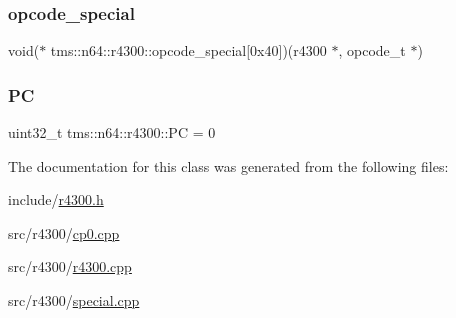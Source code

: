 \mbox{\label{classtms_1_1n64_1_1r4300_a0726d158c0880585ead0c74bcacedbc5}} 
\subsubsection{\texorpdfstring{opcode\+\_\+special}{opcode\_special}}
{\footnotesize\ttfamily void($\ast$ tms\+::n64\+::r4300\+::opcode\+\_\+special\mbox{[}0x40\mbox{]})(r4300 $\ast$, opcode\+\_\+t $\ast$)\hspace{0.3cm}{\ttfamily [private]}}

\mbox{\label{classtms_1_1n64_1_1r4300_aa173e660cb889b933ed965b6d263e3dd}} 
\subsubsection{\texorpdfstring{PC}{PC}}
{\footnotesize\ttfamily uint32\+\_\+t tms\+::n64\+::r4300\+::\+PC = 0\hspace{0.3cm}{\ttfamily [private]}}



The documentation for this class was generated from the following files\+:\begin{DoxyCompactItemize}
\item 
include/\hyperlink{r4300_8h}{r4300.\+h}\item 
src/r4300/\hyperlink{cp0_8cpp}{cp0.\+cpp}\item 
src/r4300/\hyperlink{r4300_8cpp}{r4300.\+cpp}\item 
src/r4300/\hyperlink{special_8cpp}{special.\+cpp}\end{DoxyCompactItemize}
